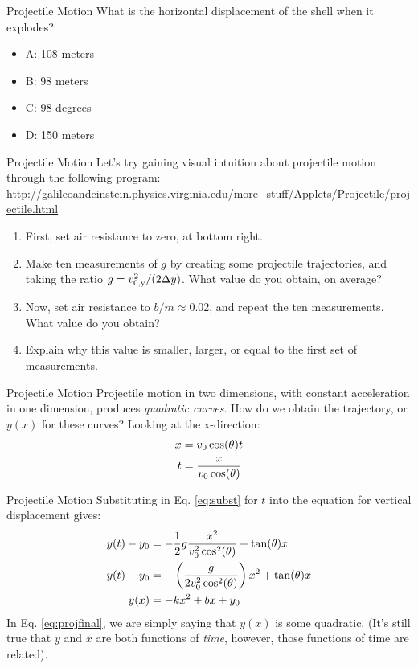 \documentclass{beamer}
\begin{document}
\begin{frame}{Projectile Motion}
What is the horizontal displacement of the shell when it explodes?
\begin{itemize}
\item A: 108 meters
\item B: 98 meters
\item C: 98 degrees
\item D: 150 meters
\end{itemize}
\end{frame}

\begin{frame}{Projectile Motion}
\small
Let's try gaining visual intuition about projectile motion through the following program: \\
\vspace{0.25cm}
\url{http://galileoandeinstein.physics.virginia.edu/more_stuff/Applets/Projectile/projectile.html}\\
\begin{enumerate}
\item First, set air resistance to zero, at bottom right.
\item Make ten measurements of $g$ by creating some projectile trajectories, and taking the ratio $g = v_{\rm 0,y}^2/(2\Delta y)$.  What value do you obtain, on average?
\item Now, set air resistance to $b/m \approx 0.02$, and repeat the ten measurements.  What value do you obtain?
\item Explain why this value is smaller, larger, or equal to the first set of measurements.
\end{enumerate}
\end{frame}

\begin{frame}{Projectile Motion}
Projectile motion in two dimensions, with constant acceleration in one dimension, produces \textit{quadratic curves}.  How do we obtain the \alert{trajectory}, or $y(x)$ for these curves?  Looking at the x-direction:\\
\begin{align}
x &= v_{\rm 0}\cos(\theta) t \\
t &= \frac{x}{v_{\rm 0} \cos(\theta)} \label{eq:subst}
\end{align}
\end{frame}

\begin{frame}{Projectile Motion}
Substituting in Eq. \ref{eq:subst} for $t$ into the equation for vertical displacement gives:\\
\begin{align}
y(t) - y_{\rm 0} &= -\frac{1}{2}g\frac{x^2}{v_{\rm 0}^2\cos^2(\theta)} + \tan(\theta) x \\
y(t) - y_{\rm 0} &= -\left(\frac{g}{2v_{\rm 0}^2\cos^2(\theta)}\right)x^2 + \tan(\theta) x \\
y(x) &= -kx^2 + bx + y_{\rm 0}\label{eq:projfinal}
\end{align}
In Eq. \ref{eq:projfinal}, we are simply saying that $y(x)$ is some quadratic.  (It's still true that $y$ and $x$ are both functions of \textit{time}, however, those functions of time are related).
\end{frame}
\end{document}
